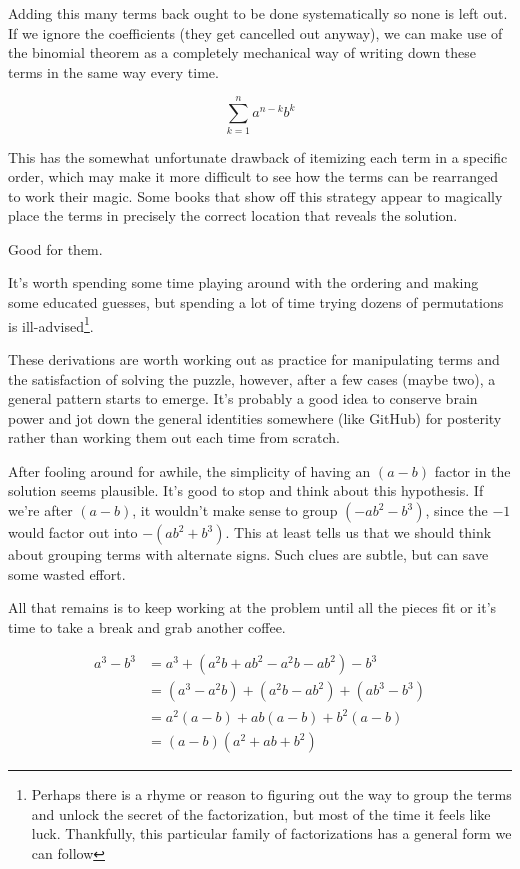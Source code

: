 \documentclass{standalone}
\begin{document}
Adding this many terms back ought to be done systematically so none is left out.
If we ignore the coefficients (they get cancelled out anyway), we can make use
of the binomial theorem as a completely mechanical way of writing down these
terms in the same way every time.

\[
  \sum_{k=1}^n a^{n-k} b^k
\]

This has the somewhat unfortunate drawback of itemizing each term in a specific
order, which may make it more difficult to see how the terms can be rearranged
to work their magic. Some books that show off this strategy appear to magically
place the terms in precisely the correct location that reveals the solution.

Good for them.

It's worth spending some time playing around with the ordering and making some
educated guesses, but spending a lot of time trying dozens of permutations is
ill-advised\footnote{Perhaps there is a rhyme or reason to figuring out the way
to group the terms and unlock the secret of the factorization, but most of the
time it feels like luck. Thankfully, this particular family of factorizations
has a general form we can follow}.

These derivations are worth working out as practice for manipulating terms and
the satisfaction of solving the puzzle, however, after a few cases (maybe two),
a general pattern starts to emerge. It's probably a good idea to conserve brain
power and jot down the general identities somewhere (like GitHub) for posterity
rather than working them out each time from scratch.

After fooling around for awhile, the simplicity of having an $(a - b)$ factor in
the solution seems plausible. It's good to stop and think about this hypothesis.
If we're after $(a - b)$, it wouldn't make sense to group $(-ab^2 - b^3)$, since
the $-1$ would factor out into $-(ab^2 + b^3)$. This at least tells us that we
should think about grouping terms with alternate signs. Such clues are subtle,
but can save some wasted effort.

All that remains is to keep working at the problem until all the pieces fit or
it's time to take a break and grab another coffee.

\begin{align*}
  a^3 - b^3
  &= a^3 + (a^2b + ab^2 - a^2b - ab^2) - b^3 \\
  &= (a^3 - a^2b) + (a^2b - ab^2) + (ab^3 - b^3) \\
  &= a^2(a - b) + ab(a - b) + b^2(a-b) \\
  &= (a - b)(a^2 + ab + b^2)
\end{align*}
\end{document}
